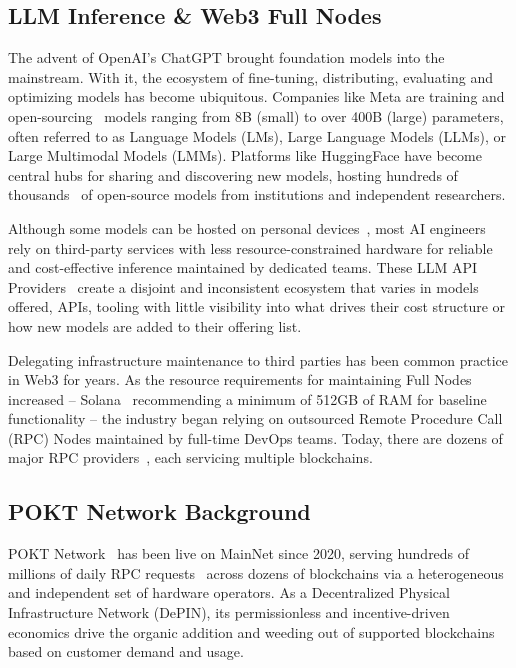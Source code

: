\documentclass[conference,compsoc]{IEEEtran}
\begin{document}
\subsection{ LLM Inference \& Web3 Full Nodes}
The advent of OpenAI’s ChatGPT brought foundation models into the mainstream. With it, the ecosystem of fine-tuning, distributing, evaluating and optimizing models has become ubiquitous. Companies like Meta are training and open-sourcing~\cite{metaIntroducingMeta} models ranging from 8B (small) to over 400B (large) parameters, often referred to as Language Models (LMs), Large Language Models (LLMs), or Large Multimodal Models (LMMs). Platforms like HuggingFace have become central hubs for sharing and discovering new models, hosting hundreds of thousands~\cite{greataipromptsEveryHugging} of open-source models from institutions and independent researchers.

Although some models can be hosted on personal devices~\cite{pytorchExecuTorchAlpha}, most AI engineers~\cite{latentRiseEngineer} rely on third-party services with less resource-constrained hardware for reliable and cost-effective inference maintained by dedicated teams. These LLM API Providers~\cite{artificialanalysisProviderLeaderboard} create a disjoint and inconsistent ecosystem that varies in models offered, APIs, tooling with little visibility into what drives their cost structure or how new models are added to their offering list.

Delegating infrastructure maintenance to third parties has been common practice in Web3 for years. As the resource requirements for maintaining Full Nodes~\cite{bitcoinRunningFull} increased – Solana~\cite{solanalabsSolanaValidator} recommending a minimum of 512GB of RAM for baseline functionality – the industry began relying on outsourced Remote Procedure Call (RPC) Nodes maintained by full-time DevOps teams. Today, there are dozens of major RPC providers~\cite{rpclistRPCListFind}, each servicing multiple blockchains.

\subsection{POKT Network Background}

POKT Network~\cite{poktWeb3Infrastructure} has been live on MainNet since 2020, serving hundreds of millions of daily RPC requests~\cite{poktscan} across dozens of blockchains via a heterogeneous and independent set of hardware operators. As a Decentralized Physical Infrastructure Network (DePIN), its permissionless and incentive-driven economics drive the organic addition and weeding out of supported blockchains based on customer demand and usage.
\end{document}
